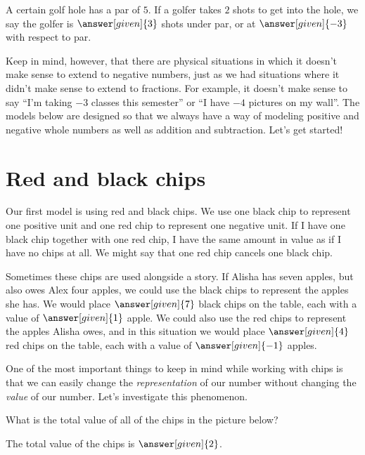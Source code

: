 \documentclass{ximera}
\begin{document}
	
	\begin{example} A certain golf hole has a par of $5$.  If a golfer takes $2$ shots to get into the hole, we say the golfer is $\answer[given]{3}$ shots under par, or at $\answer[given]{-3}$ with respect to par.  \end{example}
	
	
Keep in mind, however, that there are physical situations in which it doesn't make sense to extend to negative numbers, just as we had situations where it didn't make sense to extend to fractions. For example, it doesn't make sense to say ``I'm taking $-3$ classes this semester'' or ``I have $-4$ pictures on my wall''. The models below are designed so that we always have a way of modeling positive and negative whole numbers as well as addition and subtraction. Let's get started!
	

\section{Red and black chips}

Our first model is using red and black chips. We use one black chip to represent one positive unit and one red chip to represent one negative unit.  If I have one black chip together with one red chip, I have the same amount in value as if I have no chips at all.  We might say that one red chip cancels one black chip.  

\begin{example}
Sometimes these chips are used alongside a story.  If Alisha has seven apples, but also owes Alex four apples, we could use the black chips to represent the apples she has.  We would place $\answer[given]{7}$ black chips on the table, each with a value of $\answer[given]{1}$ apple.  We could also use the red chips to represent the apples Alisha owes, and in this situation we would place $\answer[given]{4}$ red chips on the table, each with a value of $\answer[given]{-1}$ apples.
\end{example} 

One of the most important things to keep in mind while working with chips is that we can easily change the {\em representation} of our number without changing the {\em value} of our number.  Let's investigate this phenomenon.

\begin{question}
What is the total value of all of the chips in the picture below?
\begin{center}
\end{center}
The total value of the chips is $\answer[given]{2}$.
\end{question}
\end{document}
